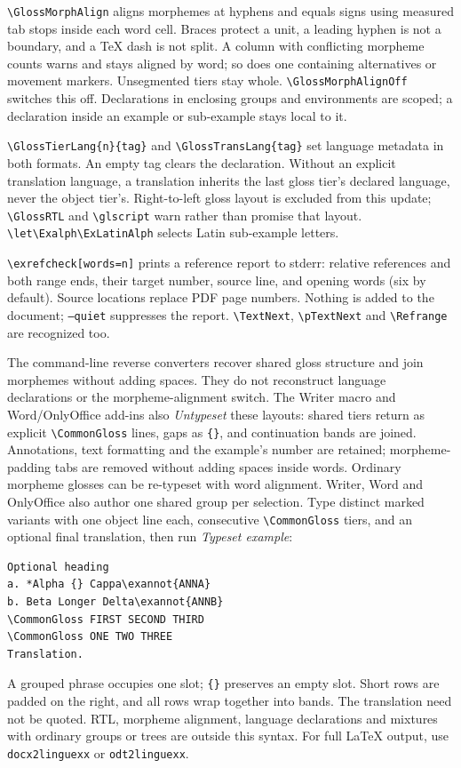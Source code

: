 \documentclass[11pt,a4paper]{article}
\newcommand{\cs}[1]{\texttt{\textbackslash #1}}
\begin{document}
\cs{GlossMorphAlign} aligns morphemes at hyphens and equals signs using
measured tab stops inside each word cell. Braces protect a unit, a leading
hyphen is not a boundary, and a TeX dash is not split. A column with
conflicting morpheme counts warns and stays aligned by word; so does one
containing alternatives or movement markers. Unsegmented tiers stay whole.
\cs{GlossMorphAlignOff} switches this off. Declarations in enclosing groups
and environments are scoped; a declaration inside an example or sub-example
stays local to it.

\cs{GlossTierLang}\texttt{\{n\}\{tag\}} and
\cs{GlossTransLang}\texttt{\{tag\}} set language metadata in both formats.
An empty tag clears the declaration. Without an explicit translation
language, a translation inherits the last gloss tier's declared language,
never the object tier's. Right-to-left gloss layout is excluded from this
update; \cs{GlossRTL} and \cs{glscript} warn rather than promise that layout.
\cs{let}\cs{Exalph}\cs{ExLatinAlph} selects Latin sub-example letters.

\cs{exrefcheck}\texttt{[words=n]} prints a reference report to stderr:
relative references and both range ends, their target number, source line,
and opening words (six by default). Source locations replace PDF page
numbers. Nothing is added to the document; \texttt{--quiet} suppresses the
report. \cs{TextNext}, \cs{pTextNext} and \cs{Refrange} are recognized too.

The command-line reverse converters recover shared gloss structure and join
morphemes without adding spaces. They do not reconstruct language declarations
or the morpheme-alignment switch. The Writer macro and Word/OnlyOffice
add-ins also \emph{Untypeset} these layouts: shared tiers return as explicit
\cs{CommonGloss} lines, gaps as \texttt{\{\}}, and continuation bands are
joined. Annotations, text formatting and the example's number are retained;
morpheme-padding tabs are removed without adding spaces inside words.
Ordinary morpheme glosses can be re-typeset with word alignment.
Writer, Word and OnlyOffice also author one shared group per selection. Type distinct marked
variants with one object line each, consecutive \cs{CommonGloss} tiers, and
an optional final translation, then run \emph{Typeset example}:
\begin{verbatim}
Optional heading
a. *Alpha {} Cappa\exannot{ANNA}
b. Beta Longer Delta\exannot{ANNB}
\CommonGloss FIRST SECOND THIRD
\CommonGloss ONE TWO THREE
Translation.
\end{verbatim}
A grouped phrase occupies one slot; \texttt{\{\}} preserves an empty slot.
Short rows are padded on the right, and all rows wrap together into bands.
The translation need not be quoted. RTL, morpheme alignment, language
declarations and mixtures with ordinary groups or trees are outside this
syntax. For full LaTeX output,
use \texttt{docx2linguexx} or \texttt{odt2linguexx}.
\end{document}
